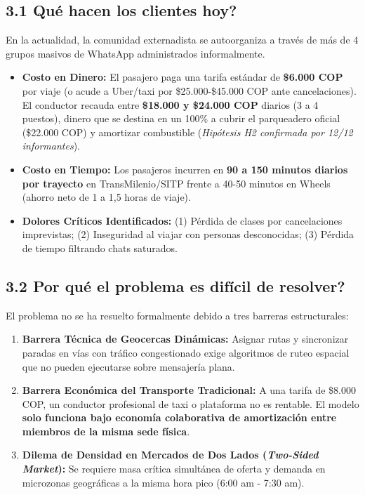 \documentclass[11pt,a4paper]{article}
\begin{document}
\subsection{3.1 \textquestiondown Qu\'e hacen los clientes hoy?}
En la actualidad, la comunidad externadista se autoorganiza a trav\'es de m\'as de 4 grupos masivos de WhatsApp administrados informalmente.
\begin{itemize}[leftmargin=*]
    \item \textbf{Costo en Dinero:} El pasajero paga una tarifa est\'andar de \textbf{\$6.000 COP} por viaje (o acude a Uber/taxi por \$25.000-\$45.000 COP ante cancelaciones). El conductor recauda entre \textbf{\$18.000 y \$24.000 COP} diarios (3 a 4 puestos), dinero que se destina en un 100\% a cubrir el parqueadero oficial (\$22.000 COP) y amortizar combustible (\textit{Hip\'otesis H2 confirmada por 12/12 informantes}).
    \item \textbf{Costo en Tiempo:} Los pasajeros incurren en \textbf{90 a 150 minutos diarios por trayecto} en TransMilenio/SITP frente a 40-50 minutos en Wheels (ahorro neto de 1 a 1,5 horas de viaje).
    \item \textbf{Dolores Cr\'iticos Identificados:} (1) P\'erdida de clases por cancelaciones imprevistas; (2) Inseguridad al viajar con personas desconocidas; (3) P\'erdida de tiempo filtrando chats saturados.
\end{itemize}

\subsection{3.2 \textquestiondown Por qu\'e el problema es dif\'icil de resolver?}
El problema no se ha resuelto formalmente debido a tres barreras estructurales:
\begin{enumerate}[leftmargin=*]
    \item \textbf{Barrera T\'ecnica de Geocercas Din\'amicas:} Asignar rutas y sincronizar paradas en v\'ias con tr\'afico congestionado exige algoritmos de ruteo espacial que no pueden ejecutarse sobre mensajer\'ia plana.
    \item \textbf{Barrera Econ\'omica del Transporte Tradicional:} A una tarifa de \$8.000 COP, un conductor profesional de taxi o plataforma no es rentable. El modelo \textbf{solo funciona bajo econom\'ia colaborativa de amortizaci\'on entre miembros de la misma sede f\'isica}.
    \item \textbf{Dilema de Densidad en Mercados de Dos Lados (\textit{Two-Sided Market}):} Se requiere masa cr\'itica simult\'anea de oferta y demanda en microzonas geogr\'aficas a la misma hora pico (6:00 am - 7:30 am).
\end{enumerate}
\end{document}
